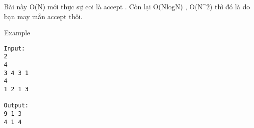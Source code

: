 Bài này O(N) mới thực sự coi là accept . Còn lại O(NlogN) , O(N^2) thì đó là do bạn may mắn accept thôi.

Example
\begin{verbatim}
Input:
2
4
3 4 3 1
4
1 2 1 3

Output:
9 1 3
4 1 4
\end{verbatim}